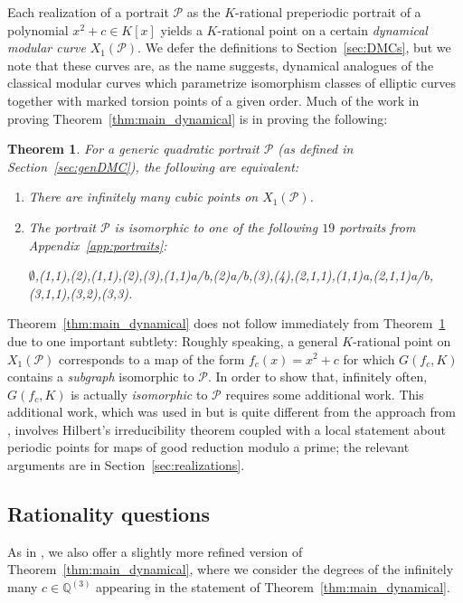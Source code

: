 \documentclass[12pt]{amsart}
\newtheorem{thm}{Theorem}[section]
\theoremstyle{definition}
\newcommand{\bbQ}{\mathbb{Q}}
\newcommand{\calP}{\mathcal{P}}
\numberwithin{equation}{section}
\begin{document}
Each realization of a portrait $\calP$ as the $K$-rational preperiodic portrait of a polynomial $x^2 + c \in K[x]$ yields a $K$-rational point on a certain \emph{dynamical modular curve} $X_1(\calP)$. We defer the definitions to Section~\ref{sec:DMCs}, but we note that these curves are, as the name suggests, dynamical analogues of the classical modular curves which parametrize isomorphism classes of elliptic curves together with marked torsion points of a given order. Much of the work in proving Theorem~\ref{thm:main_dynamical} is in proving the following:

\begin{thm}\label{thm:main_curves}
    For a \emph{generic quadratic portrait} $\calP$ (as defined in Section~\ref{sec:genDMC}), the following are equivalent:
    \begin{enumerate}[label=\rm(\alph*)]
    \item There are infinitely many cubic points on $X_1(\calP)$.
    \item The portrait $\calP$ is isomorphic to one of the following $19$ portraits from Appendix~\ref{app:portraits}:
        \begin{center}
        \rm
        $\emptyset$,(1,1),(2),(1,1),(2),(3),(1,1)a/b,(2)a/b,(3),(4),(2,1,1),(1,1)a,(2,1,1)a/b,(3,1,1),(3,2),(3,3).
        \end{center}
    \end{enumerate}
\end{thm}

Theorem~\ref{thm:main_dynamical} does not follow immediately from Theorem~\ref{thm:main_curves} due to one important subtlety: Roughly speaking, a general $K$-rational point on $X_1(\calP)$ corresponds to a map of the form $f_c(x) = x^2 + c$ for which $G(f_c,K)$ contains a \emph{subgraph} isomorphic to $\calP$. In order to show that, infinitely often, $G(f_c,K)$ is actually \emph{isomorphic} to $\calP$ requires some additional work. This additional work, which was used in \cite{doyle/krumm:2024} but is quite different from the approach from \cite{faber:2015}, involves Hilbert's irreducibility theorem coupled with a local statement about periodic points for maps of good reduction modulo a prime; the relevant arguments are in Section~\ref{sec:realizations}.

\subsection{Rationality questions}
As in \cite{doyle/krumm:2024}, we also offer a slightly more refined version of Theorem~\ref{thm:main_dynamical}, where we consider the degrees of the infinitely many $c \in\bbQ^{(3)}$ appearing in the statement of Theorem~\ref{thm:main_dynamical}.
\end{document}
